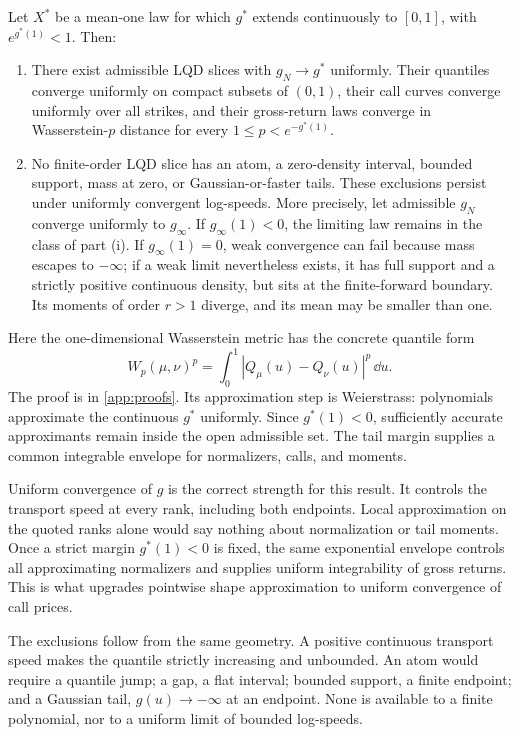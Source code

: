 \begin{proposition}
\label{prop:universal}
Let $X^*$ be a mean-one law for which $g^*$ extends continuously to
$[0,1]$, with $e^{g^*(1)}<1$.  Then:
\begin{enumerate}[label=(\roman*)]
\item There exist admissible LQD slices with $g_N\to g^*$ uniformly.  Their
quantiles converge uniformly on compact subsets of $(0,1)$, their call curves
converge uniformly over all strikes, and their gross-return laws converge in
Wasserstein-$p$ distance for every $1\le p<e^{-g^*(1)}$.
\item No finite-order LQD slice has an atom, a zero-density interval, bounded
support, mass at zero, or Gaussian-or-faster tails.  These exclusions persist
under uniformly convergent log-speeds.  More precisely, let admissible $g_N$
converge uniformly to $g_\infty$.  If $g_\infty(1)<0$, the limiting law remains
in the class of part (i).  If $g_\infty(1)=0$, weak convergence can fail because
mass escapes to $-\infty$; if a weak limit nevertheless exists, it has full
support and a strictly positive continuous density, but sits at the
finite-forward boundary.  Its moments of order $r>1$ diverge, and its mean may
be smaller than one.
\end{enumerate}
\end{proposition}

Here the one-dimensional Wasserstein metric has the concrete quantile form
\[
W_p(\mu,\nu)^p=\int_0^1|Q_\mu(u)-Q_\nu(u)|^p\,\dd u.
\]
The proof is in \cref{app:proofs}.  Its approximation step is Weierstrass:
polynomials approximate the continuous $g^*$ uniformly.  Since
$g^*(1)<0$, sufficiently accurate approximants remain inside the open
admissible set.  The tail margin supplies a common integrable envelope for
normalizers, calls, and moments.

Uniform convergence of $g$ is the correct strength for this result.  It
controls the transport speed at every rank, including both endpoints.  Local
approximation on the quoted ranks alone would say nothing about normalization
or tail moments.  Once a strict margin $g^*(1)<0$ is fixed, the same exponential
envelope controls all approximating normalizers and supplies uniform
integrability of gross returns.  This is what upgrades pointwise shape
approximation to uniform convergence of call prices.

The exclusions follow from the same geometry.  A positive continuous
transport speed makes the quantile strictly increasing and unbounded.  An
atom would require a quantile jump; a gap, a flat interval; bounded support, a
finite endpoint; and a Gaussian tail, $g(u)\to-\infty$ at an endpoint.  None is
available to a finite polynomial, nor to a uniform limit of bounded log-speeds.

